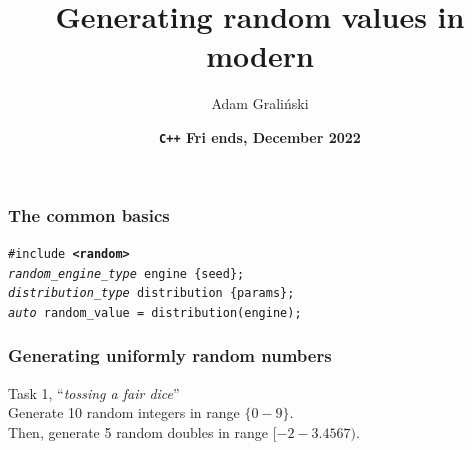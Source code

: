\documentclass[aspectratio=169]{beamer}
\title[Friends\#25 :: \cpp{Random}]{Generating random values in modern \cpp{C++}}
\author{Adam Graliński}
\date[Dec'22]{\textbf{\texttt{\color[HTML]{d33682}C++} {\color[HTML]{268bd2}F}{\color[HTML]{2aa198}r}{\color[HTML]{859900}i}%
{\color[HTML]{cb4b16}e}{\color[HTML]{dc322f}n}{\color[HTML]{6c71c4}d}{\color[HTML]{b58900}s}, December 2022}}
\begin{document}
{
\begin{frame}
\titlepage{}
\end{frame}
}

\begin{frame}[fragile]
\frametitle{The common basics}
    \texttt{\textcolor{clTwelveBitLightGray}{\#include} \textbf{\textcolor{clTwelveBitDarkGray}{<random>}}}\\
    \texttt{\textit{\textcolor{clTwelveBitCyan}{random\_engine\_type}} \textcolor{clTwelveBitOrange}{engine} \{seed\};}\\
    \texttt{\textit{\textcolor{clTwelveBitCyan}{distribution\_type}} \textcolor{clTwelveBitLightGreen}{distribution} \textcolor{clTwelveBitLightGray}{\{params\};}}\\
    \texttt{\textit{\textcolor{clTwelveBitLightGray}{auto}} \textcolor{clTwelveBitViolet}{random\_value} =
        \textcolor{clTwelveBitLightGreen}{distribution}(\textcolor{clTwelveBitOrange}{engine});}\\
\end{frame}

\begin{frame}[fragile]
\frametitle{Generating uniformly random numbers}
  {\Large Task 1, ``\textit{tossing a fair dice}''}\\
  \vspace{12pt}
  Generate 10 random integers in range $\{0-9\}$.\\
  Then, generate 5 random doubles in range $[-2 - 3.4567)$.\\
\end{frame}
\end{document}
